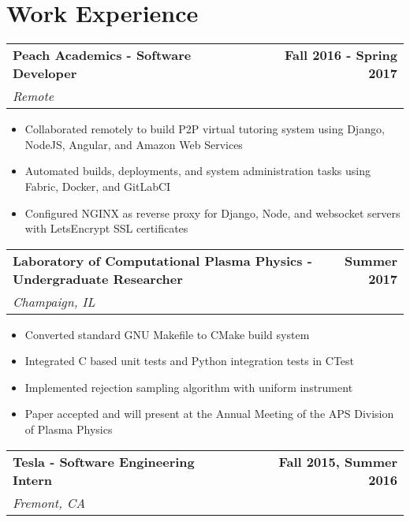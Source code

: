 \documentclass[letterpaper]{article}
\newenvironment{details}
{\begin{itemize}}
{\end{itemize}}
\begin{document}
  \section{Work Experience}
  \noindent
  \begin{tabularx}{\textwidth}{@{}X r@{}}
  	\textbf{Peach Academics - Software Developer} & \textbf{Fall 2016 - Spring 2017} \\
  	\textit{Remote}
  \end{tabularx}
  \begin{details}
  	\item Collaborated remotely to build P2P virtual tutoring system using Django, NodeJS, Angular, and Amazon Web Services 
  	\item Automated builds, deployments, and system administration tasks using Fabric, Docker, and GitLabCI
  	\item Configured NGINX  as reverse proxy for Django, Node, and websocket servers with LetsEncrypt SSL certificates
  \end{details}
	\noindent
	\begin{tabularx}{\textwidth}{@{}X r@{}}
		\textbf{Laboratory of Computational Plasma Physics - Undergraduate Researcher} & \textbf{Summer 2017} \\ \textit{Champaign, IL}
	\end{tabularx}

	\begin{details}
		\item Converted standard GNU Makefile to CMake build system 
		\item Integrated C based unit tests and Python integration tests in CTest
		\item Implemented rejection sampling algorithm with uniform instrument 
		\item Paper accepted and will present at the Annual Meeting of the APS Division of Plasma Physics
	\end{details}

  \noindent
  \begin{tabularx}{\textwidth}{@{}X r@{}}
    \textbf{Tesla - Software Engineering Intern} & \textbf{Fall 2015, Summer 2016} \\
    \textit{Fremont, CA}
  \end{tabularx}
\end{document}
